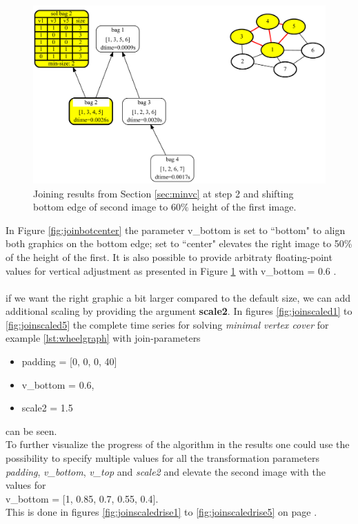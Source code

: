 \documentclass[a4paper, 12pt, bibliography=totoc]{scrartcl}
\begin{document}
\begin{figure}[H]
	\centering
	\includegraphics[width=0.9\linewidth,height=0.9\textheight,keepaspectratio]{images/SVGJOIN/default_062.pdf}
	\caption{Joining results from Section \ref{sec:minvc} at step 2 and shifting bottom edge of second image to $60\%$ height of the first image.}
	\label{fig:join60}
\end{figure}

In Figure \ref{fig:joinbotcenter} the parameter v\_bottom is set to ``bottom" to align both graphics on the bottom edge; set to ``center" elevates the right image to 50\% of the height of the first. It is also possible to provide arbitraty floating-point values for vertical adjustment as presented in Figure \ref{fig:join60} with v\_bottom = 0.6 .\\
\\
if we want the right graphic a bit larger compared to the default size, we can add additional scaling by providing the argument \textbf{scale2}. In figures \ref{fig:joinscaled1} to \ref{fig:joinscaled5} the complete time series for solving \textit{minimal vertex cover} for example \ref{lst:wheelgraph} with join-parameters
\begin{itemize}
	\item[] padding = [0, 0, 0, 40]
	\item[] v\_bottom = 0.6,
	\item[] scale2 = 1.5
\end{itemize}
can be seen. \\
To further visualize the progress of the algorithm in the results one could use the possibility to specify multiple values for all the transformation parameters \textit{padding}, \textit{v\_bottom}, \textit{v\_top} and \textit{scale2} and elevate the second image with the values for\\
 v\_bottom = [1, 0.85, 0.7, 0.55, 0.4]. \\
 This is done in figures \ref{fig:joinscaledrise1} to \ref{fig:joinscaledrise5} on page \pageref{fig:joinscaledrise1}.
\end{document}
